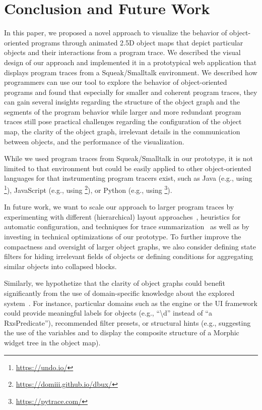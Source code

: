 \section{Conclusion and Future Work}
\label{sec:conclusion}

In this paper, we proposed a novel approach to visualize the behavior of object-oriented programs through animated 2.5D object maps that depict particular objects and their interactions from a program trace.
We described the visual design of our approach and implemented it in a prototypical web application that displays program traces from a Squeak/Smalltalk environment.
We described how programmers can use our tool to explore the behavior of object-oriented programs and found that especially for smaller and coherent program traces, they can gain several insights regarding the structure of the object graph and the segments of the program behavior while larger and more redundant program traces still pose practical challenges regarding the configuration of the object map, the clarity of the object graph, irrelevant details in the communication between objects, and the performance of the visualization.

While we used program traces from Squeak/Smalltalk in our prototype, it is not limited to that environment but could be easily applied to other object-oriented languages for that instrumenting program tracers exist, such as Java (e.g., using \footnote{\url{https://undo.io/}}), JavaScript (e.g., using \footnote{\url{https://domiii.github.io/dbux/}}), or Python (e.g., using \footnote{\url{https://pytrace.com/}}).

In future work, we want to scale our approach to larger program traces by experimenting with different (hierarchical) layout approaches~\cite{kuhn2008consistent,atzberger2023visualization}, heuristics for automatic configuration, and techniques for trace summarization~\cite{hamouLhadj2006summarizing,noda2017identifying} as well as by investing in technical optimizations of our prototype.
To further improve the compactness and oversight of larger object graphs, we also consider defining state filters for hiding irrelevant fields of objects or defining conditions for aggregating similar objects into collapsed blocks.

Similarly, we hypothetize that the clarity of object graphs could benefit significantly from the use of domain-specific knowledge about the explored system~\cite{chis2014moldable}.
For instance, particular domains such as the  engine or the  UI framework could provide meaningful labels for objects (e.g., ``\textbackslash{}d'' instead of ``a RxsPredicate''), recommended filter presets, or structural hints (e.g., suggesting the use of the variables  and  to display the composite structure of a Morphic widget tree in the object map).

